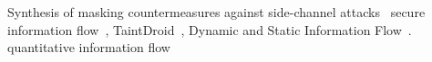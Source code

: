 Synthesis of masking countermeasures against side-channel attacks~\cite{EW14}
secure information flow~\cite{Den76}, TaintDroid~\cite{Enck14}, Dynamic and
Static Information Flow~\cite{SR10}.
quantitative information flow~\cite{smith09}





